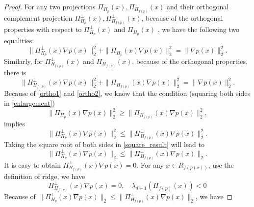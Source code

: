 \documentclass[aos,preprint]{imsart}
\theoremstyle{remark}
\begin{document}
\begin{appendix}
\begin{proof}
For any two projections $\Pi_{H_p}(x), \Pi_{H_{f(p)}}(x)$ and their orthogonal complement projection $\Pi^\perp_{H_p}(x), \Pi^\perp_{H_{f(p)}}(x)$, because of the orthogonal properties with respect to $\Pi_{H_p}^{\perp}(x)$ and $\Pi_{H_p}(x)$ , we have the following two equalities:
\begin{equation}\label{ortho1}
\|\Pi_{H_p}^{\perp}(x) \nabla p(x)\|_2^2 +\|\Pi_{H_p}(x) \nabla p(x)\|_2^2 = \|\nabla p(x)\|_2^2.
\end{equation}
Similarly, for $\Pi_{H_{f(p)}}^{\perp}(x)$ and $\Pi_{H_{f(p)}}(x)$, because of the orthogonal properties, there is
\begin{equation}\label{ortho2}
\|\Pi_{H_{f(p)}}^{\perp}(x) \nabla p(x)\|_2^2 +\|\Pi_{H_{f(p)}}(x) \nabla p(x)\|_2^2 = \|\nabla p(x)\|_2^2.
\end{equation}
Because of \eqref{ortho1} and \eqref{ortho2}, we know that the condition (squaring both sides in \eqref{enlargement})
 \[
\|\Pi_{H_p}(x)\nabla p(x)\|_2^2 \geq \|\Pi_{H_{f(p)}}(x)\nabla p(x)\|_2^2,
\] 
implies
\begin{equation}\label{square_result}
\|\Pi_{H_p}^{\perp}(x)\nabla p(x)\|_2^2 \leq \|\Pi_{H_{f(p)}}^{\perp}(x)\nabla p(x)\|_2^2.
\end{equation}
Taking the square root of both sides in \eqref{square_result} will lead to
\begin{equation}\label{llll}
\|\Pi_{H_p}^{\perp}(x)\nabla p(x)\|_2 \leq \|\Pi_{H_{f(p)}}^{\perp}(x)\nabla p(x)\|_2.
\end{equation}
It is easy to obtain $\Pi_{H_{f(p)}}^{\perp}(x)\nabla p(x) = 0$. For any $x\in R_{f(p(x))}$, use the definition of ridge, we have 
\[
 \Pi_{H_{f(p)}}^{\perp} (x) \nabla p(x) = 0,\quad \lambda_{d+1}(H_{f(p)}(x))<0
\] %
Because of $\|\Pi_{H_p}^\perp(x)\nabla p(x)\|_2 \leq \|\Pi_{H_{f(p)}}^{\perp}(x)\nabla p(x)\|_2$, we have 

\end{proof}
\end{appendix}
\end{document}
